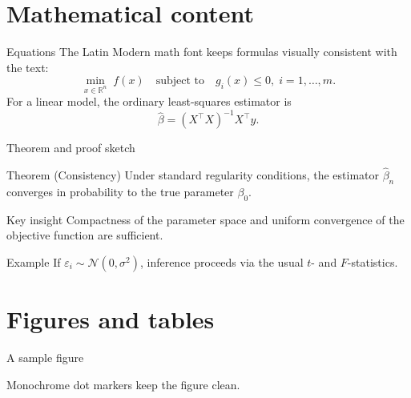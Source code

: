 \documentclass[aspectratio=169,10pt]{beamer}
\begin{document}
\section{Mathematical content}

\begin{frame}{Equations}
  The Latin Modern math font keeps formulas visually consistent with the text:
  \[
    \min_{x \in \mathbb{R}^n} \; f(x)
    \quad \text{subject to} \quad
    g_i(x) \leq 0, \; i = 1, \dots, m.
  \]
  \vspace{0.3cm}
  For a linear model, the ordinary least-squares estimator is
  \[
    \hat{\beta} = (X^{\top} X)^{-1} X^{\top} y.
  \]
\end{frame}

\begin{frame}{Theorem and proof sketch}
  \begin{block}{Theorem (Consistency)}
    Under standard regularity conditions, the estimator \(\hat{\beta}_n\) converges in probability to the true parameter \(\beta_0\).
  \end{block}
  \vspace{0.3cm}
  \begin{alertblock}{Key insight}
    Compactness of the parameter space and uniform convergence of the objective function are sufficient.
  \end{alertblock}
  \vspace{0.3cm}
  \begin{exampleblock}{Example}
    If \(\varepsilon_i \sim \mathcal{N}(0, \sigma^2)\), inference proceeds via the usual \(t\)- and \(F\)-statistics.
  \end{exampleblock}
\end{frame}

\section{Figures and tables}

\begin{frame}{A sample figure}
  \begin{center}
  \end{center}
  \vspace{0.3cm}
  Monochrome dot markers keep the figure clean.
\end{frame}
\end{document}
